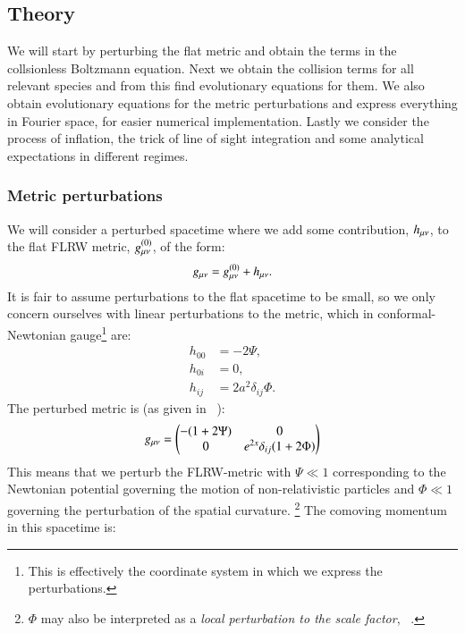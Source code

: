 \subsection{Theory}\label{sec:m3:theory}
    We will start by perturbing the flat metric and obtain the terms in the collsionless Boltzmann equation. Next we obtain the collision terms for all relevant species and from this find evolutionary equations for them. We also obtain evolutionary equations for the metric perturbations and express everything in Fourier space, for easier numerical implementation. Lastly we consider the process of inflation, the trick of line of sight integration and some analytical expectations in different regimes. 

\subsubsection{Metric perturbations}
    We will consider a perturbed spacetime where we add some contribution, $h_{\mu\nu}$, to the flat FLRW metric, $g_{\mu\nu}^{(0)}$, of the form:
    \begin{equation}
        g_{\mu\nu} = g_{\mu\nu}^{(0)} + h_{\mu\nu}.
    \end{equation}
    It is fair to assume perturbations to the flat spacetime to be small, so we only concern ourselves with linear perturbations to the metric, which in conformal-Newtonian gauge\footnote{This is effectively the coordinate system in which we express the perturbations.} are:
    \begin{equation}
        \begin{split}
            h_{00} &= -2\Psi, \\
            h_{0i} &= 0,\\
            h_{ij} &= 2a^2\delta_{ij}\Phi.
        \end{split}
    \end{equation}
    The perturbed metric is (as given in ~\cite{https://doi.org/10.48550/arxiv.astro-ph/0606683}):
    \begin{equation}\label{eq:m3:theory:perturbed_metric}
        g_{\mu\nu} = \begin{pmatrix}
            -(1+2\Psi) & 0 \\
            0 & e^{2x}\delta_{ij}(1+2\Phi)
        \end{pmatrix}
    \end{equation}
    This means that we perturb the FLRW-metric with $\Psi\ll1$ corresponding to the Newtonian potential governing the motion of non-relativistic particles and $\Phi\ll1$ governing the perturbation of the spatial curvature. \footnote{$\Phi$ may also be interpreted as a \textit{local perturbation to the scale factor}, ~\cite{dodelson2020modern}.} The comoving momentum in this spacetime is:
